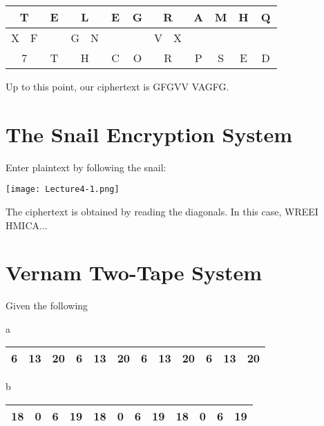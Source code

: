 \documentclass[11pt]{article}
\theoremstyle{definition}\newtheorem{definition}{Definition}
\theoremstyle{definition}\newtheorem{example}{Example}
\theoremstyle{definition}\newtheorem{samplecode}{Sample Code}
\begin{document}
\begin{center}
\begin{tabular}{|cc|cc|cc|cc|cc|cc|cc|cc|cc|cc|}
        \multicolumn{2}{|c|}{T}   & \multicolumn{2}{c|}{E}   & \multicolumn{2}{c|}{L}   & \multicolumn{2}{c|}{E}   & \multicolumn{2}{c|}{G}   & \multicolumn{2}{c|}{R}   & \multicolumn{2}{c|}{A}   & \multicolumn{2}{c|}{M}   & \multicolumn{2}{c|}{H}   & \multicolumn{2}{c|}{Q}   \\ \hline
        \multicolumn{1}{|c|}{X} & F & \multicolumn{1}{c|}{} &  & \multicolumn{1}{c|}{G} & N & \multicolumn{1}{c|}{} &  & \multicolumn{1}{c|}{} &  & \multicolumn{1}{c|}{V} & X & \multicolumn{1}{c|}{} &  & \multicolumn{1}{c|}{} &  & \multicolumn{1}{c|}{} &  & \multicolumn{1}{c|}{} &  \\ \hline
        \multicolumn{2}{|c|}{7}   & \multicolumn{2}{c|}{T}   & \multicolumn{2}{c|}{H}   & \multicolumn{2}{c|}{C}   & \multicolumn{2}{c|}{O}   & \multicolumn{2}{c|}{R}   & \multicolumn{2}{c|}{P}   & \multicolumn{2}{c|}{S}   & \multicolumn{2}{c|}{E}   & \multicolumn{2}{c|}{D}   \\ \hline
        \end{tabular}
\end{center}
Up to this point, our ciphertext is GFGVV VAGFG.

\section{The Snail Encryption System}

Enter plaintext by following the snail:
\begin{center}
    \texttt{[image: Lecture4-1.png]}
\end{center}
The ciphertext is obtained by reading the diagonals. In this case, WREEI HMICA...

\section{Vernam Two-Tape System}

Given the following
\begin{center}
    a \begin{tabular}{|ccc|ccc|ccc|ccc|} \hline
        6 & 13 & 20 & 6 & 13 & 20 & 6 & 13 & 20 & 6 & 13 & 20 \\ \hline
    \end{tabular}

    b \begin{tabular}{|cccc|cccc|cccc|} \hline
        18 & 0 & 6 & 19 & 18 & 0 & 6 & 19 & 18 & 0 & 6 & 19 \\ \hline
    \end{tabular}
\end{center}
\end{document}
